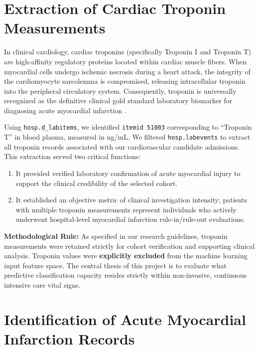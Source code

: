 \section{Extraction of Cardiac Troponin Measurements}
\label{sec:troponin_extraction}

In clinical cardiology, cardiac troponins (specifically Troponin I and Troponin T) are high-affinity regulatory proteins located within cardiac muscle fibers. When myocardial cells undergo ischemic necrosis during a heart attack, the integrity of the cardiomyocyte sarcolemma is compromised, releasing intracellular troponin into the peripheral circulatory system. Consequently, troponin is universally recognized as the definitive clinical gold standard laboratory biomarker for diagnosing acute myocardial infarction \citep{thygesen2018fourth}.

Using \texttt{hosp.d\_labitems}, we identified \texttt{itemid 51003} corresponding to ``Troponin T'' in blood plasma, measured in ng/mL. We filtered \texttt{hosp.labevents} to extract all troponin records associated with our cardiovascular candidate admissions. This extraction served two critical functions:
\begin{enumerate}
    \item It provided verified laboratory confirmation of acute myocardial injury to support the clinical credibility of the selected cohort.
    \item It established an objective metric of clinical investigation intensity; patients with multiple troponin measurements represent individuals who actively underwent hospital-level myocardial infarction rule-in/rule-out evaluations.
\end{enumerate}

\textbf{Methodological Rule:} As specified in our research guidelines, troponin measurements were retained strictly for cohort verification and supporting clinical analysis. Troponin values were \textbf{explicitly excluded} from the machine learning input feature space. The central thesis of this project is to evaluate what predictive classification capacity resides strictly within non-invasive, continuous intensive care vital signs.

\section{Identification of Acute Myocardial Infarction Records}
\label{sec:ami_identification}

